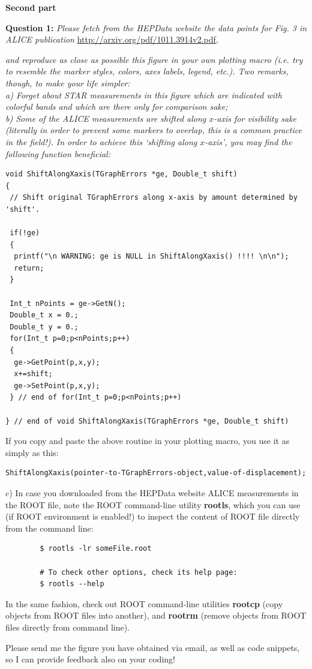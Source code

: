 \documentclass[11pt]{article}
\begin{document}
\bigskip\bigskip

\noindent \textbf{\Large Second part}

\noindent\textbf{Question 1:} {\it Please fetch from the HEPData website the data points for Fig. 3 in ALICE publication} \url{http://arxiv.org/pdf/1011.3914v2.pdf}, {\it and reproduce as close as possible this figure in your own plotting macro (i.e. try to resemble the marker styles, colors, axes labels, legend, etc.). Two remarks, though, to make your life simpler:\\
%
\noindent a) Forget about STAR measurements in this figure which are indicated with colorful bands and which are there only for comparison sake;\\
%
\noindent b) Some of the ALICE measurements are shifted along $x$-axis for visibility sake (literally in order to prevent some markers to overlap, this is a common practice in the field!). In order to achieve this `shifting along $x$-axis', you may find the following function beneficial:

\newpage

{\small
\begin{verbatim}
void ShiftAlongXaxis(TGraphErrors *ge, Double_t shift)
{
 // Shift original TGraphErrors along x-axis by amount determined by 'shift'.
 
 if(!ge)
 {
  printf("\n WARNING: ge is NULL in ShiftAlongXaxis() !!!! \n\n");
  return;
 }
  
 Int_t nPoints = ge->GetN();
 Double_t x = 0.;
 Double_t y = 0.;
 for(Int_t p=0;p<nPoints;p++)
 { 
  ge->GetPoint(p,x,y);
  x+=shift;
  ge->SetPoint(p,x,y);
 } // end of for(Int_t p=0;p<nPoints;p++)

} // end of void ShiftAlongXaxis(TGraphErrors *ge, Double_t shift)
\end{verbatim}
}
%
\noindent If you copy and paste the above routine in your plotting macro, you use it as simply as this:
{\small
\begin{verbatim}
ShiftAlongXaxis(pointer-to-TGraphErrors-object,value-of-displacement);
\end{verbatim}
}

%
\noindent c) In case you downloaded from the HEPData website ALICE measurements in the ROOT file, note the ROOT command-line utility {\rm\bf rootls}, which you can use (if ROOT environment is enabled!) to inspect the content of ROOT file directly from the command line:
{\small
	\begin{verbatim}
		$ rootls -lr someFile.root
		
		# To check other options, check its help page:
		$ rootls --help
	\end{verbatim}
}

\noindent In the same fashion, check out ROOT command-line utilities {\rm\bf rootcp} (copy objects from ROOT files into another), and {\rm\bf rootrm} (remove objects from ROOT files directly from command line).

}

\bigskip

\noindent Please send me the figure you have obtained via email, as well as code snippets, so I can provide feedback also on your coding!
\end{document}
